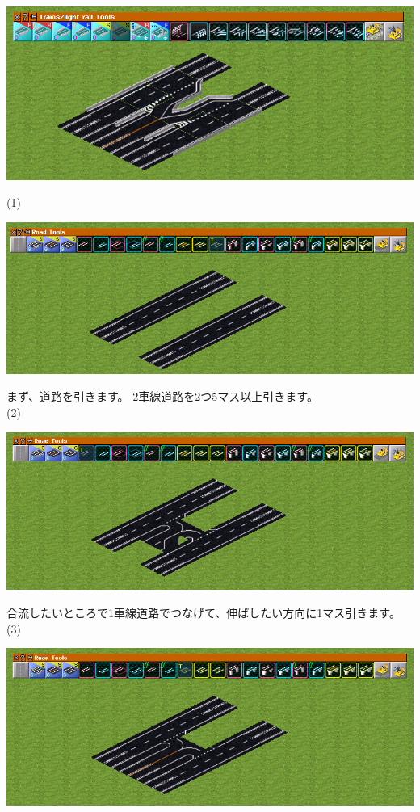 \documentclass{jbook}
\begin{document}
  \includegraphics[width = 135mm]{picture/20210214-road-1-9.png}

  \vspace{10pt}

  (1)

  \includegraphics[width = 135mm]{picture/20210214-road-1-1.png}


  まず、道路を引きます。
  2車線道路を2つ5マス以上引きます。
  \\

  (2)

  \includegraphics[width = 135mm]{picture/20210214-road-1-2.png}


  合流したいところで1車線道路でつなげて、伸ばしたい方向に1マス引きます。
  \\

\newpage
  (3)

  \includegraphics[width = 135mm]{picture/20210214-road-1-3.png}
\end{document}

